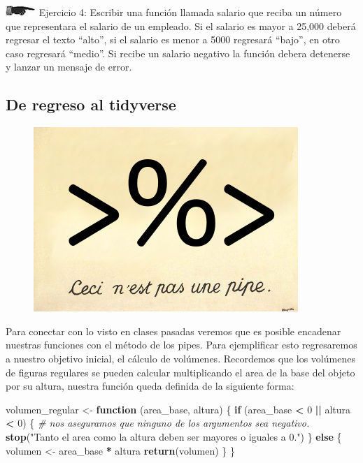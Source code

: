 \documentclass[]{book}
\newenvironment{Shaded}{\begin{snugshade}}{\end{snugshade}}
\newcommand{\KeywordTok}[1]{\textcolor[rgb]{0.13,0.29,0.53}{\textbf{#1}}}
\newcommand{\DecValTok}[1]{\textcolor[rgb]{0.00,0.00,0.81}{#1}}
\newcommand{\StringTok}[1]{\textcolor[rgb]{0.31,0.60,0.02}{#1}}
\newcommand{\CommentTok}[1]{\textcolor[rgb]{0.56,0.35,0.01}{\textit{#1}}}
\newcommand{\ControlFlowTok}[1]{\textcolor[rgb]{0.13,0.29,0.53}{\textbf{#1}}}
\newcommand{\OperatorTok}[1]{\textcolor[rgb]{0.81,0.36,0.00}{\textbf{#1}}}
\newcommand{\NormalTok}[1]{#1}
\theoremstyle{definition}
\theoremstyle{definition}
\theoremstyle{definition}
\theoremstyle{remark}
\begin{document}
\includegraphics{./imagenes/manicule2.jpg} Ejercicio 4: Escribir una
función llamada salario que reciba un número que representara el salario
de un empleado. Si el salario es mayor a 25,000 deberá regresar el texto
``alto'', si el salario es menor a 5000 regresará ``bajo'', en otro caso
regresará ``medio''. Si recibe un salario negativo la función debera
detenerse y lanzar un mensaje de error.

\subsection{De regreso al tidyverse}\label{de-regreso-al-tidyverse}

\begin{figure}
\centering
\includegraphics{./imagenes/ceci.jpg}
\caption{}
\end{figure}

Para conectar con lo visto en clases pasadas veremos que es posible
encadenar nuestras funciones con el método de los pipes. Para
ejemplificar esto regresaremos a nuestro objetivo inicial, el cálculo de
volúmenes. Recordemos que los volúmenes de figuras regulares se pueden
calcular multiplicando el area de la base del objeto por su altura,
nuestra función queda definida de la siguiente forma:

\begin{Shaded}
\begin{Highlighting}[]
\NormalTok{volumen_regular <-}\StringTok{ }\ControlFlowTok{function}\NormalTok{ (area_base, altura) \{}
  \ControlFlowTok{if}\NormalTok{ (area_base }\OperatorTok{<}\StringTok{ }\DecValTok{0} \OperatorTok{||}\StringTok{ }\NormalTok{altura }\OperatorTok{<}\StringTok{ }\DecValTok{0}\NormalTok{) \{ }\CommentTok{# nos aseguramos que ninguno de los argumentos sea negativo.}
    \KeywordTok{stop}\NormalTok{(}\StringTok{"Tanto el area como la altura deben ser mayores o iguales a 0."}\NormalTok{)}
\NormalTok{  \} }\ControlFlowTok{else}\NormalTok{ \{}
\NormalTok{    volumen <-}\StringTok{ }\NormalTok{area_base }\OperatorTok{*}\StringTok{ }\NormalTok{altura}
    \KeywordTok{return}\NormalTok{(volumen)}
\NormalTok{  \}}
\NormalTok{\}}
\end{Highlighting}
\end{Shaded}
\end{document}
